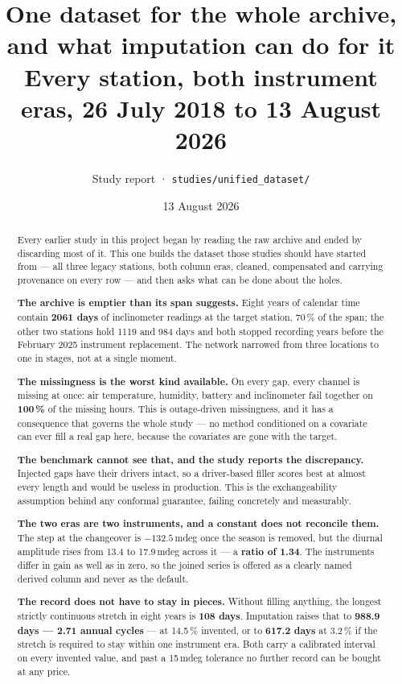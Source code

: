 \documentclass[11pt,a4paper]{article}
\title{\vspace{-1.2cm}\textbf{One dataset for the whole archive, and what
imputation can do for it}\\[2mm]
\large Every station, both instrument eras, 26 July 2018 to 13 August 2026}
\author{Study report · \texttt{studies/unified\_dataset/}}
\date{13 August 2026}
\begin{document}
\maketitle
\thispagestyle{fancy}

\begin{abstract}
\noindent
Every earlier study in this project began by reading the raw archive and ended
by discarding most of it. This one builds the dataset those studies should have
started from --- all three legacy stations, both column eras, cleaned,
compensated and carrying provenance on every row --- and then asks what can be
done about the holes.

\textbf{The archive is emptier than its span suggests.} Eight years of calendar
time contain \textbf{2061 days} of inclinometer readings at the target station,
70\,\% of the span; the other two stations hold 1119 and 984 days and both
stopped recording years before the February 2025 instrument replacement. The
network narrowed from three locations to one in stages, not at a single moment.

\textbf{The missingness is the worst kind available.} On every gap, every
channel is missing at once: air temperature, humidity, battery and inclinometer
fail together on \textbf{100\,\%} of the missing hours. This is outage-driven
missingness, and it has a consequence that governs the whole study --- no method
conditioned on a covariate can ever fill a real gap here, because the covariates
are gone with the target.

\textbf{The benchmark cannot see that, and the study reports the discrepancy.}
Injected gaps have their drivers intact, so a driver-based filler scores best at
almost every length and would be useless in production. This is the
exchangeability assumption behind any conformal guarantee, failing concretely
and measurably.

\textbf{The two eras are two instruments, and a constant does not reconcile
them.} The step at the changeover is $-132.5$\,mdeg once the season is removed,
but the diurnal amplitude rises from 13.4 to 17.9\,mdeg across it --- a
\textbf{ratio of 1.34}. The instruments differ in gain as well as in zero, so
the joined series is offered as a clearly named derived column and never as the
default.

\textbf{The record does not have to stay in pieces.} Without filling anything,
the longest strictly continuous stretch in eight years is \textbf{108 days}.
Imputation raises that to \textbf{988.9 days --- 2.71 annual cycles} --- at
14.5\,\% invented, or to \textbf{617.2 days} at 3.2\,\% if the stretch is
required to stay within one instrument era. Both carry a calibrated interval on
every invented value, and past a 15\,mdeg tolerance no further record can be
bought at any price.
\end{abstract}
\end{document}
